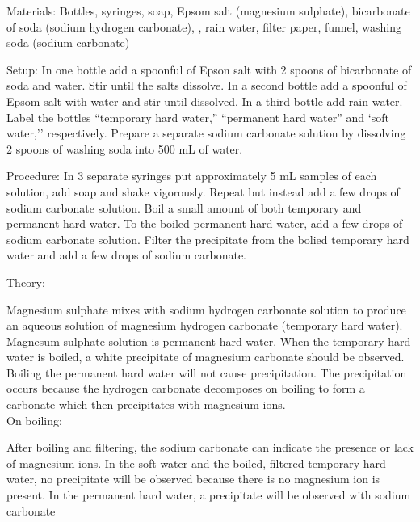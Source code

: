\begin{multicols}{2}
\begin{description*}
\item[Materials:]{Bottles, syringes, soap, Epsom salt (magnesium sulphate), bicarbonate of soda (sodium hydrogen carbonate), , rain water, filter paper, funnel, washing soda (sodium carbonate)}
\item[Setup:]{In one bottle add a spoonful of Epson salt with 2 spoons of bicarbonate of soda and water. Stir until the salts dissolve. In a second bottle add a spoonful of Epsom salt with water and stir until dissolved. In a third bottle add rain water. Label the bottles ``temporary hard water,'' ``permanent hard water'' and `soft water,'' respectively. Prepare a separate sodium carbonate solution by dissolving 2 spoons of washing soda into 500 mL of water.}
\item[Procedure:]{In 3 separate syringes put approximately 5 mL samples of each solution, add soap and shake vigorously. Repeat but instead add a few drops of sodium carbonate solution. Boil a small amount of both temporary and permanent hard water. To the boiled permanent hard water, add a few drops of sodium carbonate solution. Filter the precipitate from the bolied temporary hard water and add a few drops of sodium carbonate.}
\item[Theory:]{Magnesium sulphate mixes with sodium hydrogen carbonate solution to produce  an aqueous solution of magnesium hydrogen carbonate (temporary hard water). Magnesum sulphate solution is permanent hard water. When the temporary hard water is boiled, a white precipitate of magnesium carbonate should be observed. Boiling the permanent hard water will not cause precipitation.
The precipitation occurs because the hydrogen carbonate decomposes on boiling to form a carbonate which then precipitates with magnesium ions.\\
On boiling: 
\begin{center}
\end{center}
After boiling and filtering, the sodium carbonate can indicate the presence or lack of magnesium ions. In the soft water and the boiled, filtered temporary hard water, no precipitate will be observed because there is no magnesium ion is present. In the permanent hard water, a precipitate will be observed with sodium carbonate}
\end{description*}


\end{multicols}
